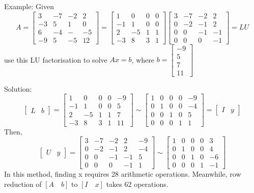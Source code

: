\documentclass[12pt]{article} %
\begin{document}
Example:
Given 
$$A = \begin{bmatrix}
	3 & -7 & -2 & 2\\
	-3 & 5 & 1 & 0\\
	6 & -4 & - & -5\\
	-9 & 5 & -5 & 12
\end{bmatrix} = \begin{bmatrix}
	1 & 0 & 0 & 0\\
	-1 & 1 & 0 & 0\\
	2 & -5 & 1 & 1\\
	-3 & 8 & 3 & 1
\end{bmatrix} \begin{bmatrix}
	3 & -7 & -2 & 2\\
	0 & -2 & -1 & 2\\
	0 & 0 & -1 & -1\\
	0 & 0 & 0 & -1
\end{bmatrix} = LU$$
use this LU factorisation to solve $Ax = b$, where $b = \begin{bmatrix}
	-9\\
	5\\
	7\\
	11
\end{bmatrix}$

Solution:
$$\begin{bmatrix}
	L & b
\end{bmatrix} = \begin{bmatrix}
	1 & 0 & 0 & 0 & -9\\
	-1 & 1 & 0 & 0 & 5\\
	2 & -5 & 1 & 1 & 7\\
	-3 & 8 & 3 & 1 & 11
\end{bmatrix} \sim \begin{bmatrix}
	1 & 0 & 0 & 0 & -9\\
	0 & 1 & 0 & 0 & -4\\
	0 & 0 & 1 & 0 & 5\\
	0 & 0 & 0 & 1 & 1
\end{bmatrix} = \begin{bmatrix}
	I & y
\end{bmatrix}$$
Then, 
$$\begin{bmatrix}
	U & y
\end{bmatrix} = \begin{bmatrix}
	3 & -7 & -2 & 2 & -9\\
	0 & -2 & -1 & 2 & -4\\
	0 & 0 & -1 & -1 & 5\\
	0 & 0 & 0 & -1 & 1
\end{bmatrix} \sim \begin{bmatrix}
	1 & 0 & 0 & 0 & 3\\
	0 & 1 & 0 & 0 & 4\\
	0 & 0 & 1 & 0 & -6\\
	0 & 0 & 0 & 1 & -1
\end{bmatrix}$$
In this method, finding x requires 28 arithmetic operations. Meanwhile, row reduction of $\left[A \quad b\right]$ to  $\left[I \quad x\right]$ takes 62 operations.
\end{document}
